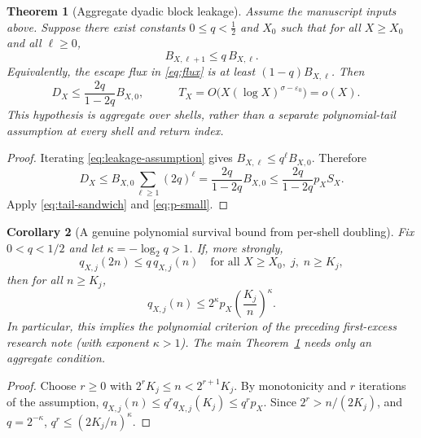 \documentclass[11pt,a4paper]{article}
\newtheorem{theorem}{Theorem}
\newtheorem{corollary}[theorem]{Corollary}
\theoremstyle{remark}
\begin{document}
\begin{theorem}[Aggregate dyadic block leakage]\label{thm:leakage}
Assume the manuscript inputs above.  Suppose there exist constants
$0\le q<\frac12$ and $X_0$ such that for all $X\ge X_0$ and all
$\ell\ge0$,
\begin{equation}\label{eq:leakage-assumption}
\boxed{\quad B_{X,\ell+1}\le q\,B_{X,\ell}.\quad}
\end{equation}
Equivalently, the escape flux in \eqref{eq:flux} is at least
$(1-q)B_{X,\ell}$.  Then
\[
D_X\le\frac{2q}{1-2q}B_{X,0},\qquad
\boxed{\quad T_X=O\bigl(X(\log X)^{\sigma-\varepsilon_0}\bigr)=o(X).\quad}
\]
This hypothesis is \emph{aggregate over shells}, rather than a
separate polynomial-tail assumption at every shell and return index.
\end{theorem}
\begin{proof}
Iterating \eqref{eq:leakage-assumption} gives
$B_{X,\ell}\le q^\ell B_{X,0}$.  Therefore
\[
D_X\le B_{X,0}\sum_{\ell\ge1}(2q)^\ell
=\frac{2q}{1-2q}B_{X,0}\le
\frac{2q}{1-2q}p_XS_X.
\]
Apply \eqref{eq:tail-sandwich} and \eqref{eq:p-small}.
\end{proof}

\begin{corollary}[A genuine polynomial survival bound from
per-shell doubling]\label{cor:poly}
Fix $0<q<1/2$ and let $\kappa=-\log_2q>1$.  If, more strongly,
\[
q_{X,j}(2n)\le q\,q_{X,j}(n)
\quad\text{for all }X\ge X_0,\;j,\;n\ge K_j,
\]
then for all $n\ge K_j$,
\begin{equation}\label{eq:polynomial}
\boxed{\quad q_{X,j}(n)
\le 2^\kappa p_X\left(\frac{K_j}{n}\right)^\kappa.\quad}
\end{equation}
In particular, this implies the polynomial criterion of the
preceding first-excess research note (with exponent $\kappa>1$).
The main Theorem~\ref{thm:leakage} needs only an aggregate condition.
\end{corollary}
\begin{proof}
Choose $r\ge0$ with $2^rK_j\le n<2^{r+1}K_j$.
By monotonicity and $r$ iterations of the assumption,
$q_{X,j}(n)\le q^r q_{X,j}(K_j)\le q^r p_X$.
Since $2^r>n/(2K_j)$, and $q=2^{-\kappa}$,
$q^r\le(2K_j/n)^\kappa$.
\end{proof}
\end{document}
